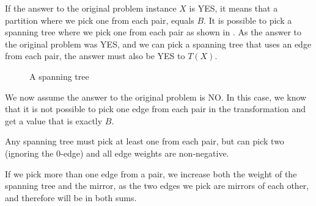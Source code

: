 If the answer to the original problem instance $X$ is YES, it means that a partition where we pick one from each pair, equals $B$. It is possible to pick a spanning tree where we pick one from each pair as shown in . As the answer to the original problem was YES, and we can pick a spanning tree that uses an edge from each pair, the answer must also be YES to $T(X)$.

\begin{figure}[htb]
\caption{A spanning tree}
\label{fig:transform3}
\end{figure}

We now assume the answer to the original problem is NO. In this case, we know that it is not possible to pick one edge from each pair in the transformation and get a value that is exactly $B$. 

Any spanning tree must pick at least one from each pair, but can pick two (ignoring the $0$-edge) and all edge weights are non-negative. 

If we pick more than one edge from a pair, we increase both the weight of the spanning tree and the mirror, as the two edges we pick are mirrors of each other, and therefore will be in both sums.


